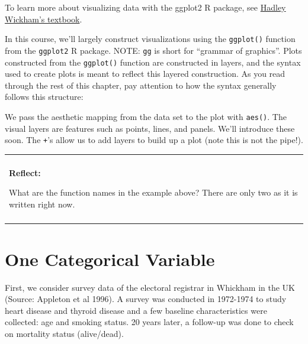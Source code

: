\documentclass[]{book}
\newenvironment{Shaded}{\begin{snugshade}}{\end{snugshade}}
\newcommand{\DataTypeTok}[1]{\textcolor[rgb]{0.13,0.29,0.53}{#1}}
\newcommand{\KeywordTok}[1]{\textcolor[rgb]{0.13,0.29,0.53}{\textbf{#1}}}
\newcommand{\NormalTok}[1]{#1}
\newcommand{\OperatorTok}[1]{\textcolor[rgb]{0.81,0.36,0.00}{\textbf{#1}}}
\newcommand{\StringTok}[1]{\textcolor[rgb]{0.31,0.60,0.02}{#1}}
\newenvironment{reflect}
{
    \begin{center}
    
    \begin{tabular}{|p{0.8\textwidth}|}
    \rowcolor{LightBlue}
    \hline\\
    \rowcolor{LightBlue}
    \textbf{Reflect:}
}
{
    \\\rowcolor{LightBlue}
    \\\hline
    \end{tabular} 
    \end{center}
}
\begin{document}
To learn more about visualizing data with the ggplot2 R package, see \href{https://r4ds.had.co.nz/data-visualisation.html}{Hadley Wickham's textbook}.

In this course, we'll largely construct visualizations using the \texttt{ggplot()} function from the \texttt{ggplot2} R package. NOTE: \texttt{gg} is short for ``grammar of graphics''. Plots constructed from the \texttt{ggplot()} function are constructed in layers, and the syntax used to create plots is meant to reflect this layered construction. As you read through the rest of this chapter, pay attention to how the syntax generally follows this structure:

\begin{Shaded}
\end{Shaded}

We pass the aesthetic mapping from the data set to the plot with \texttt{aes()}. The visual layers are features such as points, lines, and panels. We'll introduce these soon. The \texttt{+}'s allow us to add layers to build up a plot (note this is not the pipe!).

\begin{reflect}
What are the function names in the example above? There are only two as
it is written right now.
\end{reflect}

\hypertarget{one-categorical-variable}{%
\section{One Categorical Variable}\label{one-categorical-variable}}

First, we consider survey data of the electoral registrar in Whickham in the UK (Source: Appleton et al 1996). A survey was conducted in 1972-1974 to study heart disease and thyroid disease and a few baseline characteristics were collected: age and smoking status. 20 years later, a follow-up was done to check on mortality status (alive/dead).
\end{document}
